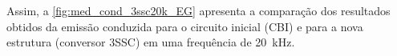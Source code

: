     Assim, a \autoref{fig:med_cond_3ssc20k_EG} apresenta a comparação dos resultados obtidos da emissão conduzida para o circuito inicial (CBI) e para a nova estrutura (conversor 3SSC) em uma frequência de \SI{20}{\kilo\hertz}.
    
    
    
    
    
    
    
